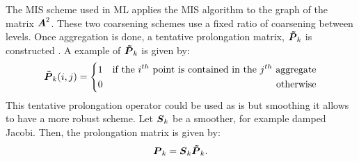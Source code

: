 The MIS scheme used in ML applies the MIS algorithm \cite{graph_coloring} to
the graph of the matrix $\boldsymbol{A}^2$. These two coarsening 
schemes use a fixed ratio of coarsening between levels. 
%
Once aggregation is done, a tentative prolongation matrix, $\boldsymbol{\tilde{P}}_k$ 
is constructed \cite{mis}. A example of $\boldsymbol{\tilde{P}}_k$ is given by:
\begin{equation}
  \boldsymbol{\tilde{P}}_k(i,j) = \left\{
  \begin{aligned}
    &1 &\textrm{if the }i^{th}\textrm{ point is contained in the }j^{th}\textrm{
    aggregate}\\
    & 0 &\textrm{otherwise}
  \end{aligned}
  \right.
\end{equation}
This tentative prolongation operator could be used as is but smoothing it
allows to have a more robust scheme. Let $\boldsymbol{S}_k$ be a smoother, for example
damped Jacobi. Then, the prolongation matrix is given by:
\begin{equation}
  \boldsymbol{P}_k = \boldsymbol{S}_k \boldsymbol{\tilde{P}}_k.
\end{equation}


